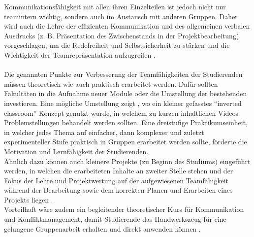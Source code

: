 \documentclass[a4paper]{article}
\newcommand{\komm}[1]{{ \color{blue}}}%
\begin{document}
Kommunikationsfähigkeit mit allen ihren Einzelteilen ist jedoch nicht nur teamintern wichtig, sondern auch im Austausch mit anderen Gruppen. Daher wird auch die Lehre der effizienten Kommunikation und des allgemeinen verbalen Ausdrucks (z. B. Präsentation des Zwischenstands in der Projektbearbeitung) vorgeschlagen, um die Redefreiheit und Selbstsicherheit zu stärken und die Wichtigkeit der Teamrepräsentation aufzugreifen \cite{lifeskills_engineers}.\\\\
Die genannten Punkte zur Verbesserung der Teamfähigkeiten der Studierenden müssen theoretisch wie auch praktisch erarbeitet werden. 
\komm{Mikro-Module?}
Dafür sollten Fakultäten in die Aufnahme neuer Module oder die Umstellung der bestehenden investieren. Eine mögliche Umstellung zeigt \cite{blended_teaching_innovationability}, wo ein kleiner gefasstes "`inverted classroom"' Konzept genutzt wurde, in welchem zu kurzen inhaltlichen Videos Problemstellungen behandelt werden sollten. Eine dreistufige Praktikumseinheit, in welcher jedes Thema auf einfacher, dann komplexer und zuletzt experimenteller Stufe praktisch in Gruppen erarbeitet werden sollte, förderte die Motivation und Lernfähigkeit der Studierenden.\\
Ähnlich dazu können auch kleinere Projekte (zu Beginn des Studiums) eingeführt werden, in welchen die erarbeiteten Inhalte an zweiter Stelle stehen und der Fokus der Lehre und Projektwertung auf der aufgewiesenen Teamfähigkeit während der Bearbeitung sowie dem korrekten Planen und Erarbeiten eines Projekts liegen \cite{teamworkstrat_firstsem_engineering} \cite{4Cs_teamwork_china}.\\
Vorteilhaft wäre zudem ein begleitender theoretischer Kurs für Kommunikation und Konfliktmanagement, damit Studierende das Handwerkszeug für eine gelungene Gruppenarbeit erhalten und direkt anwenden können \cite{teamworkstrat_firstsem_engineering}.
\komm{ein Mikro-Modul umfasst maximal 180 min, also ein theoretischer Einstieg wäre vielleicht gut oder ein konkretes Szenarion}
\end{document}
